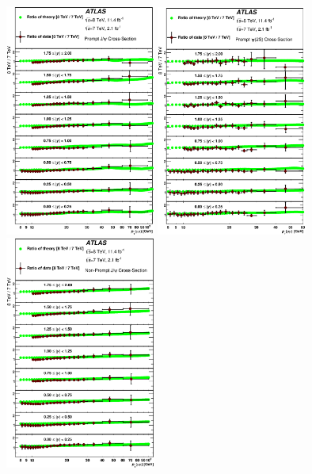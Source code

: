 \begin{description}[style=unboxed,leftmargin=0cm]
\begin{figure} [!ht]
  \begin{center}
    \includegraphics[width=0.44\textwidth]{figures/rt_th_xSecP_J.eps} 
    \includegraphics[width=0.44\textwidth]{figures/rt_th_xSecP_P.eps}\hfil\\
    \includegraphics[width=0.44\textwidth]{figures/rt_th_xSecNP_J.eps}

\end{center}
\end{figure}
\end{description}
